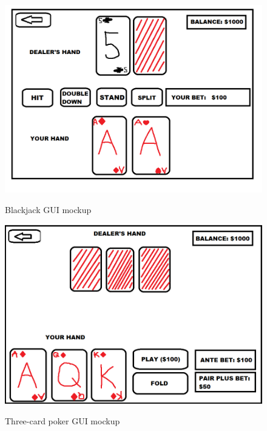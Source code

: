 \documentclass[10pt,conference,onecolumn,compsoc]{IEEEtran}
\begin{document}
\newpage

\begin{figure}[h]
\caption{Blackjack GUI mockup}
\includegraphics[scale=0.4]{blackjack}
\label{fig:blackjack}
\centering
\end{figure}

\newpage

\begin{figure}[h]
\caption{Three-card poker GUI mockup}
\includegraphics[scale=0.4]{three-card}
\label{fig:three-card}
\centering
\end{figure}
\end{document}
